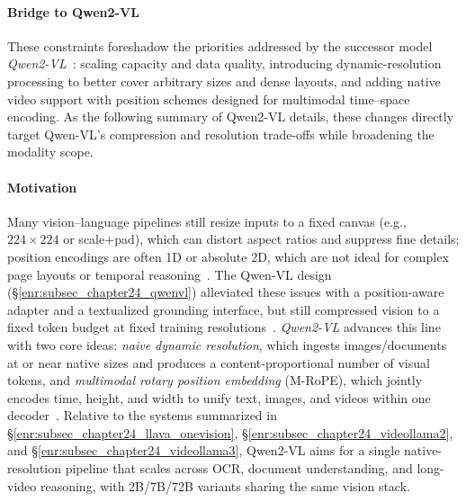\begin{enrichment}
\begin{enrichment}
        \paragraph{Bridge to Qwen2\mbox{-}VL}
        These constraints foreshadow the priorities addressed by the successor model \emph{Qwen2\mbox{-}VL}~\cite{wang2024_qwen2vl}: scaling capacity and data quality, introducing dynamic\mbox{-}resolution processing to better cover arbitrary sizes and dense layouts, and adding native video support with position schemes designed for multimodal time–space encoding. As the following summary of Qwen2-VL details, these changes directly target Qwen\mbox{-}VL’s compression and resolution trade\mbox{-}offs while broadening the modality scope.
        
    \end{enrichment}
    
    \newpage
    
    \begin{enrichment}
        \label{enr:subsec_chapter24_qwen2vl}
        
        \paragraph{Motivation}
        Many vision--language pipelines still resize inputs to a fixed canvas (e.g., $224{\times}224$ or scale{+}pad), which can distort aspect ratios and suppress fine details; position encodings are often 1D or absolute 2D, which are not ideal for complex page layouts or temporal reasoning~\cite{li2024_llavaonevision,cheng2024_videollama2,zhang2025_videollama3}. The Qwen\mbox{-}VL design (\S\ref{enr:subsec_chapter24_qwenvl}) alleviated these issues with a position\mbox{-}aware adapter and a textualized grounding interface, but still compressed vision to a fixed token budget at fixed training resolutions~\cite{bai2023_qwenvl}. \emph{Qwen2\mbox{-}VL} advances this line with two core ideas: \emph{naive dynamic resolution}, which ingests images/documents at or near native sizes and produces a content\mbox{-}proportional number of visual tokens, and \emph{multimodal rotary position embedding} (M\mbox{-}RoPE), which jointly encodes time, height, and width to unify text, images, and videos within one decoder~\cite{wang2024_qwen2vl}. Relative to the systems summarized in \S\ref{enr:subsec_chapter24_llava_onevision}, \S\ref{enr:subsec_chapter24_videollama2}, and \S\ref{enr:subsec_chapter24_videollama3}, Qwen2\mbox{-}VL aims for a single native\mbox{-}resolution pipeline that scales across OCR, document understanding, and long\mbox{-}video reasoning, with 2B/7B/72B variants sharing the same vision stack.
        

\end{enrichment}
\end{enrichment}
